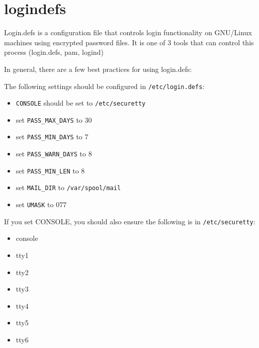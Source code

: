 \section{logindefs}

Login.defs is a configuration file that controls login functionality on GNU/Linux machines using encrypted password files.
It is one of 3 tools that can control this process (login.defs, pam, logind)

In general, there are a few best practices for using login.defs:

The following settings should be configured in \lstinline|/etc/login.defs|:
\begin{itemize}
	\item \lstinline|CONSOLE| should be set to \lstinline|/etc/securetty|
	\item set \lstinline|PASS_MAX_DAYS| to 30
	\item set \lstinline|PASS_MIN_DAYS| to 7
	\item set \lstinline|PASS_WARN_DAYS| to 8
	\item set \lstinline|PASS_MIN_LEN| to 8
	\item set \lstinline|MAIL_DIR| to \lstinline|/var/spool/mail|
	\item set \lstinline|UMASK| to 077
\end{itemize}

If you set CONSOLE, you should also ensure the following is in \lstinline|/etc/securetty|:
\begin{itemize}
	\item console
	\item tty1
	\item tty2
	\item tty3
	\item tty4
	\item tty5
	\item tty6
\end{itemize}
